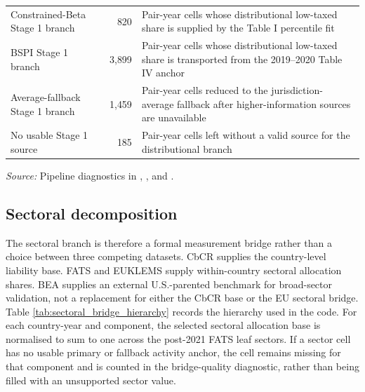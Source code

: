 \documentclass[11pt,a4paper]{article}
\begin{document}
\begin{table}[H]
\begin{tabularx}{\textwidth}{@{}L{4.7cm}rX@{}}
Constrained-Beta Stage 1 branch & 820 & Pair-year cells whose distributional low-taxed share is supplied by the Table I percentile fit \\
BSPI Stage 1 branch & 3{,}899 & Pair-year cells whose distributional low-taxed share is transported from the 2019--2020 Table IV anchor \\
Average-fallback Stage 1 branch & 1{,}459 & Pair-year cells reduced to the jurisdiction-average fallback after higher-information sources are unavailable \\
No usable Stage 1 source & 185 & Pair-year cells left without a valid source for the distributional branch \\
\bottomrule
\end{tabularx}
\begin{flushleft}
\footnotesize\textit{Source:} Pipeline diagnostics in , , and .
\end{flushleft}
\end{table}

\subsection{Sectoral decomposition}\label{app:sector}

The sectoral branch is therefore a formal measurement bridge rather than a choice between three competing datasets. CbCR supplies the country-level liability base. FATS and EUKLEMS supply within-country sectoral allocation shares. BEA supplies an external U.S.-parented benchmark for broad-sector validation, not a replacement for either the CbCR base or the EU sectoral bridge. Table \ref{tab:sectoral_bridge_hierarchy} records the hierarchy used in the code. For each country-year and component, the selected sectoral allocation base is normalised to sum to one across the post-2021 FATS leaf sectors. If a sector cell has no usable primary or fallback activity anchor, the cell remains missing for that component and is counted in the bridge-quality diagnostic, rather than being filled with an unsupported sector value.
\end{document}

